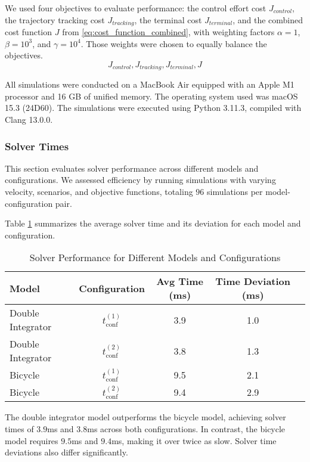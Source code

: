 We used four objectives to evaluate performance: the control effort cost $J_{control}$, the trajectory tracking cost $J_{tracking}$, the terminal
cost $J_{terminal}$, and the combined cost function $J$ from \eqref{eq:cost_function_combined}, with weighting factors $\alpha = 1$, $\beta = 10^3$,
and $\gamma = 10^4$.
Those weights were chosen to equally balance the objectives.
\[
	J_{control}, J_{tracking}, J_{terminal}, J
\]

All simulations were conducted on a MacBook Air equipped with an Apple M1 processor and 16 GB of unified memory.
The operating system used was macOS 15.3 (24D60).
The simulations were executed using Python 3.11.3, compiled with Clang 13.0.0.

\subsubsection{Solver Times}

This section evaluates solver performance across different models and configurations.
We assessed efficiency by running simulations with varying velocity, scenarios, and objective functions, totaling $96$ simulations per
model-configuration pair.

Table \ref{tab:solver_performance} summarizes the average solver time and its deviation for each model and configuration.

\begin{table}[h]
	\centering
	\caption{Solver Performance for Different Models and Configurations}
	\label{tab:solver_performance}
	\begin{tabular}{lcccc}
		\toprule
		\textbf{Model}    & \textbf{Configuration}  & \textbf{Avg Time (ms)} & \textbf{Time Deviation (ms)} \\
		\midrule
		Double Integrator & $t_{\text{conf}}^{(1)}$ & 3.9                    & 1.0                          \\
		Double Integrator & $t_{\text{conf}}^{(2)}$ & 3.8                    & 1.3                          \\
		Bicycle           & $t_{\text{conf}}^{(1)}$ & 9.5                    & 2.1                          \\
		Bicycle           & $t_{\text{conf}}^{(2)}$ & 9.4                    & 2.9                          \\
		\bottomrule
	\end{tabular}
\end{table}

The double integrator model outperforms the bicycle model, achieving solver times of $3.9$ms and $3.8$ms across both configurations.
In contrast, the bicycle model requires $9.5$ms and $9.4$ms, making it over twice as slow.
Solver time deviations also differ significantly.

